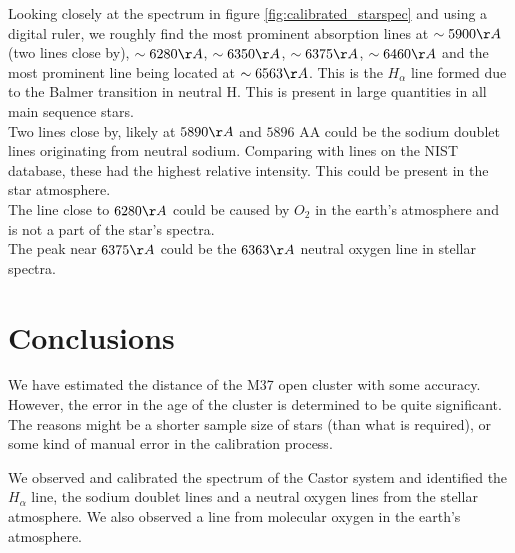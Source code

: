\documentclass[12pt,a4paper]{article}
\begin{document}
      Looking closely at the spectrum in figure \ref{fig:calibrated_starspec} and using a digital ruler, we roughly find the most prominent absorption lines at $\sim 5900 \AA$(two lines close by), $\sim 6280 \AA$, $\sim 6350 \AA$, $\sim 6375 \AA$, $\sim 6460 \AA$ and the most prominent line 
      being located at $\sim 6563 \AA$. This is the $H_\alpha$ line formed due to the Balmer transition in neutral H. This is present in large quantities in all main sequence stars.\\
      Two lines close by, likely at $5890 \AA$ and $5896$ AA could be the sodium doublet lines originating from neutral sodium. Comparing with lines on the NIST database, these had the highest relative intensity.\cite{NIST_ASD} This could be present in the star atmosphere. \\
      The line close to $6280 \AA$ could be caused by $O_2$ in the earth's atmosphere and is not a part of the star's spectra. \\


      The peak near $6375 \AA$ could be the $6363 \AA$ neutral oxygen line in stellar spectra.\\




\section{Conclusions}
We have estimated the distance of the M37 open cluster with some accuracy. However, the error in the age of the cluster is determined to be quite significant. The reasons might be a shorter sample size of stars (than what is required), or some kind of manual error in the calibration process.


We observed and calibrated the spectrum of the Castor system and identified the $H_\alpha$ line, the sodium doublet lines and a neutral oxygen lines from the stellar atmosphere. We also observed a line from molecular oxygen in the earth's atmosphere.
\setcounter{secnumdepth}{0}

\printbibliography

\end{document}

